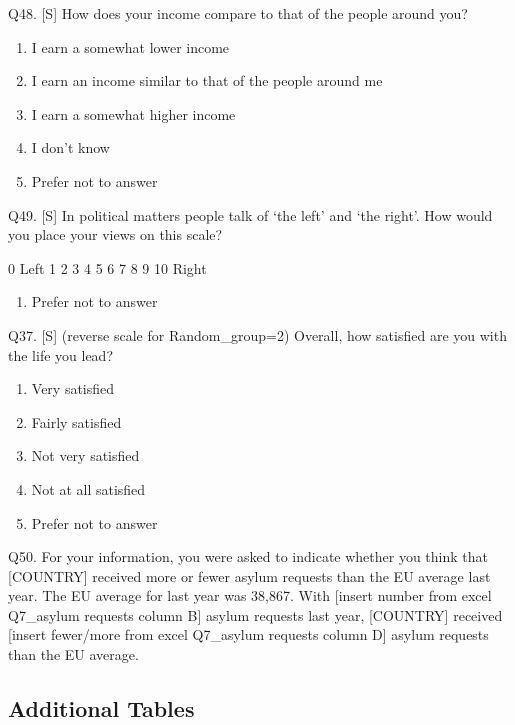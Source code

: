 \documentclass[
  12pt,
  a4paper,
]{article}
\providecommand{\tightlist}{%
  \setlength{\itemsep}{0pt}\setlength{\parskip}{0pt}}
\begin{document}
Q48. {[}S{]} How does your income compare to that of the people around you?

\begin{enumerate}
\def\labelenumi{\arabic{enumi}.}
\tightlist
\item
  I earn a somewhat lower income
\item
  I earn an income similar to that of the people around me
\item
  I earn a somewhat higher income
\item
  I don't know
\item
  Prefer not to answer
\end{enumerate}

Q49. {[}S{]} In political matters people talk of `the left' and `the right'. How would you place your views on this scale?

0
Left 1 2 3 4 5 6 7 8 9 10
Right

\begin{enumerate}
\def\labelenumi{\arabic{enumi}.}
\setcounter{enumi}{98}
\tightlist
\item
  Prefer not to answer
\end{enumerate}

Q37. {[}S{]} (reverse scale for Random\_group=2) Overall, how satisfied are you with the life you lead?

\begin{enumerate}
\def\labelenumi{\arabic{enumi}.}
\tightlist
\item
  Very satisfied
\item
  Fairly satisfied
\item
  Not very satisfied
\item
  Not at all satisfied
\item
  Prefer not to answer
\end{enumerate}

Q50. For your information, you were asked to indicate whether you think that {[}COUNTRY{]} received more or fewer asylum requests than the EU average last year. The EU average for last year was 38,867. With {[}insert number from excel Q7\_asylum requests column B{]} asylum requests last year, {[}COUNTRY{]} received {[}insert fewer/more from excel Q7\_asylum requests column D{]} asylum requests than the EU average.

\subsection{Additional Tables}\label{additional-tables}
\end{document}
